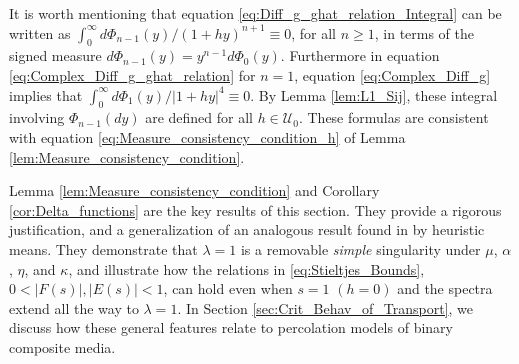 \documentclass[english,12pt,jmp,graphicx]{revtex4-1}
\begin{document}
It is worth mentioning that equation
\eqref{eq:Diff_g_ghat_relation_Integral} can be written as
$\int_0^\infty d\Phi_{n-1}(y)/(1+hy)^{n+1}\equiv0$, for all $n\geq1$, in terms of the
signed measure $d\Phi_{n-1}(y)=y^{n-1}d\Phi_0(y)$. Furthermore in equation
\eqref{eq:Complex_Diff_g_ghat_relation} for $n=1$, equation
\eqref{eq:Complex_Diff_g} implies that $\int_0^\infty d\Phi_1(y)/|1+hy|^4\equiv0$.
By Lemma \ref{lem:L1_Sij}, these integral involving 
$\Phi_{n-1}(dy)$ are defined for all $h\in\mathcal{U}_0$. These formulas
are consistent with equation
\eqref{eq:Measure_consistency_condition_h} of Lemma
\ref{lem:Measure_consistency_condition}. 

Lemma \ref{lem:Measure_consistency_condition} and Corollary 
\ref{cor:Delta_functions} are the key results of this section. They
provide a rigorous justification, and a generalization of an
analogous result found in \cite{Day:JPCM-96} by heuristic means. They
demonstrate that $\lambda=1$ is a removable \emph{simple} singularity under
$\mu$, $\alpha$, $\eta$, and $\kappa$, and illustrate how the relations in
\eqref{eq:Stieltjes_Bounds}, $0<|F(s)|,|E(s)\mid<1$, can hold even when
$s=1$ $(h=0)$ and the spectra extend all the way to $\lambda=1$. In Section 
\ref{sec:Crit_Behav_of_Transport}, we discuss how these general
features relate to percolation models of binary composite media. 
       
%
\end{document}
